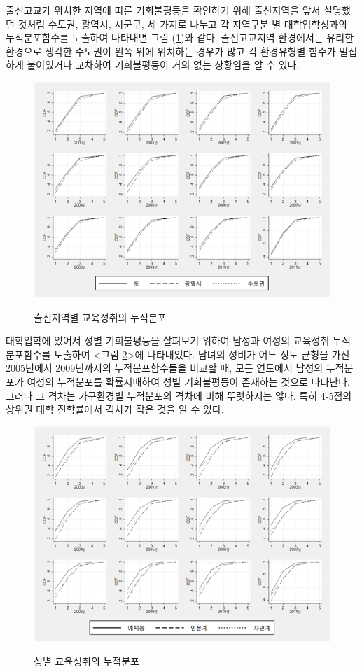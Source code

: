 출신고교가 위치한 지역에 따른 기회불평등을 확인하기 위해 출신지역을 앞서 설명했던 것처럼 수도권, 광역시, 시군구, 세 가지로 나누고 각 지역구분 별 대학입학성과의 누적분포함수를 도출하여 나타내면 그림 (\ref{fig:goms_cdf_byrgn})와 같다.
출신고교지역 환경에서는 유리한 환경으로 생각한 수도권이 왼쪽 위에 위치하는 경우가 많고 각 환경유형별 함수가 밀접하게 붙어있거나 교차하여 기회불평등이 거의 없는 상황임을 알 수 있다. 

\begin{figure}
    \centering
    \caption{출신지역별 교육성취의 누적분포}
    \includegraphics[width=\textwidth]{figure/goms_cdf_byrgn.png}
    \label{fig:goms_cdf_byrgn}
\end{figure}

대학입학에 있어서 성별 기회불평등을 살펴보기 위하여 남성과 여성의 교육성취 누적분포함수를 도출하여 <그림 \ref{fig:goms_cdf_bysex}>에 나타내었다.
남녀의 성비가 어느 정도 균형을 가진 2005년에서 2009년까지의 누적분포함수들을 비교할 때, 모든 연도에서 남성의 누적분포가 여성의 누적분포를 확률지배하여 성별 기회불평등이 존재하는 것으로 나타난다.
 그러나 그 격차는 가구환경별 누적분포의 격차에 비해 뚜렷하지는 않다. 특히 4-5점의 상위권 대학 진학률에서 격차가 작은 것을 알 수 있다.
 
\begin{figure}
    \centering
    \caption{성별 교육성취의 누적분포}
    \includegraphics[width=\textwidth]{figure/goms_cdf_bysex.png}
    \label{fig:goms_cdf_bysex}
\end{figure}

